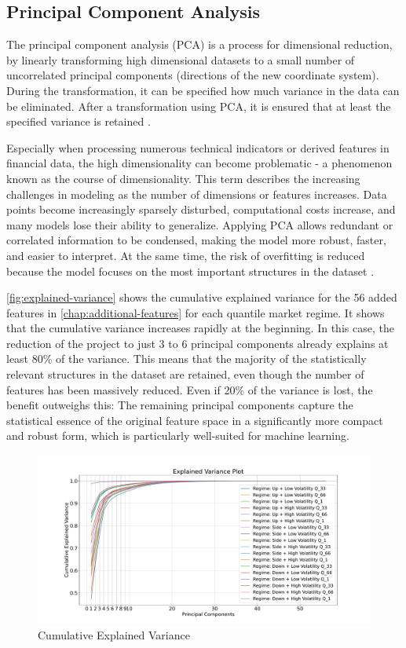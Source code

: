 \subsection{Principal Component Analysis}

The principal component analysis (PCA) is a process for dimensional reduction, by linearly transforming high dimensional datasets to a small number of uncorrelated principal components  (directions of the new coordinate system).
During the transformation, it can be specified how much variance in the data can be eliminated.
After a transformation using PCA, it is ensured that at least the specified variance is retained \cite{wikipedia-pca}.

Especially when processing numerous technical indicators or derived features in financial data, the high dimensionality can become problematic - a phenomenon known as the course of dimensionality.
This term describes the increasing challenges in modeling as the number of dimensions or features increases.
Data points become increasingly sparsely disturbed, computational costs increase, and many models lose their ability to generalize.
Applying PCA allows redundant or correlated information to be condensed, making the model more robust, faster, and easier to interpret.
At the same time, the risk of overfitting is reduced because the model focuses on the most important structures in the dataset \cite{wikipedia-curse-od-dimensionality}.

\autoref{fig:explained-variance} shows the cumulative explained variance for the 56 added features in \autoref{chap:additional-features} for each quantile market regime.
It shows that the cumulative variance increases rapidly at the beginning.
In this case, the reduction of the project to just 3 to 6 principal components already explains at least 80\% of the variance.
This means that the majority of the statistically relevant structures in the dataset are retained, even though the number of features has been massively reduced.
Even if 20\% of the variance is lost, the benefit outweighs this: The remaining principal components capture the statistical essence of the original feature space in a significantly more compact and robust form, which is particularly well-suited for machine learning.


\begin{figure}[H]
    \centering
    \includegraphics[width=\textwidth]{images/eda/explained_variance}
    \caption{Cumulative Explained Variance}
    \label{fig:explained-variance}
\end{figure}

